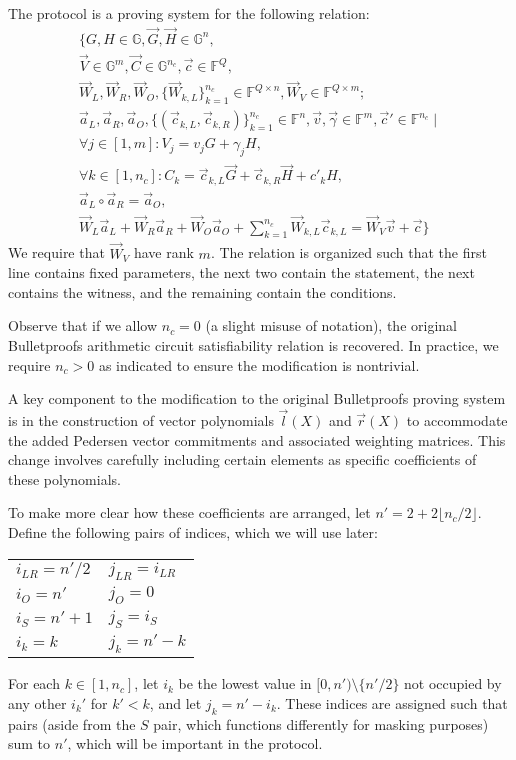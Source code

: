 \documentclass{article}
\newcommand{\GG}{\mathbb{G}}
\newcommand{\FF}{\mathbb{F}}
\newcommand{\mat}[1]{\vec{#1}}
\begin{document}
The protocol is a proving system for the following relation:
\begin{multline}
\label{eqn:relation}
\Biggl\{ G, H \in \GG, \vec{G}, \vec{H} \in \GG^n, \\
\vec{V} \in \GG^m, \vec{C} \in \GG^{n_c}, \vec{c} \in \FF^Q, \\
\mat{W}_L, \mat{W}_R, \mat{W}_O, \{ \mat{W}_{k,L} \}_{k=1}^{n_c} \in \FF^{Q \times n}, \mat{W}_V \in \FF^{Q \times m} ; \\
\vec{a}_L, \vec{a}_R, \vec{a}_O, \{ (\vec{c}_{k,L}, \vec{c}_{k,R}) \}_{k=1}^{n_c} \in \FF^n, \vec{v}, \vec{\gamma} \in \FF^m, \vec{c}' \in \FF^{n_c} \mid \\
\forall j \in [1, m]: V_j = v_j G + \gamma_j H, \\
\forall k \in [1, n_c]: C_k = \vec{c}_{k,L} \vec{G} + \vec{c}_{k,R} \vec{H} + c'_k H, \\
\vec{a}_L \circ \vec{a}_R = \vec{a}_O, \\
\mat{W}_L \vec{a}_L + \mat{W}_R \vec{a}_R + \mat{W}_O \vec{a}_O + \sum_{k=1}^{n_c} \mat{W}_{k,L} \vec{c}_{k,L} = \mat{W}_V \vec{v} + \vec{c} \Biggr\}
\end{multline}
We require that $\mat{W}_V$ have rank $m$.
The relation is organized such that the first line contains fixed parameters, the next two contain the statement, the next contains the witness, and the remaining contain the conditions.

Observe that if we allow $n_c = 0$ (a slight misuse of notation), the original Bulletproofs arithmetic circuit satisfiability relation is recovered.
In practice, we require $n_c > 0$ as indicated to ensure the modification is nontrivial.

A key component to the modification to the original Bulletproofs proving system is in the construction of vector polynomials $\vec{l}(X)$ and $\vec{r}(X)$ to accommodate the added Pedersen vector commitments and associated weighting matrices.
This change involves carefully including certain elements as specific coefficients of these polynomials.

To make more clear how these coefficients are arranged, let $n' = 2 + 2 \lfloor n_c / 2 \rfloor$.
Define the following pairs of indices, which we will use later:
\begin{center}
	\begin{tabular}{ll}
		$i_{LR} = n'/2$ & $j_{LR} = i_{LR}$ \\
		$i_O = n'$ & $j_O = 0$ \\
		$i_S = n' + 1$ & $j_S = i_S$ \\
		$i_k = k$ & $j_k = n' - k$
	\end{tabular}
\end{center}
For each $k \in [1, n_c]$, let $i_k$ be the lowest value in $[0, n') \setminus \{ n'/2 \}$ not occupied by any other $i_k'$ for $k' < k$, and let $j_k = n' - i_k$.
These indices are assigned such that pairs (aside from the $S$ pair, which functions differently for masking purposes) sum to $n'$, which will be important in the protocol.
\end{document}
